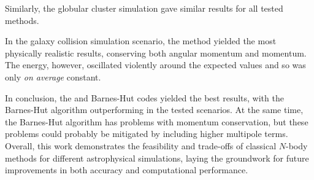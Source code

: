 Similarly, the globular cluster simulation gave similar results for all tested methods.

In the galaxy collision simulation scenario, the \PThreeM{} method yielded the most physically realistic results, conserving both angular momentum and momentum.
The energy, however, oscillated violently around the expected values and so was only \textit{on average} constant.

In conclusion, the \PThreeM{} and Barnes-Hut codes yielded the best results, with the Barnes-Hut algorithm outperforming \PThreeM{} in the tested scenarios.
At the same time, the Barnes-Hut algorithm has problems with momentum conservation, but these problems could probably be mitigated by including higher multipole terms.
Overall, this work demonstrates the feasibility and trade-offs of classical $N$-body methods for different astrophysical simulations, laying the groundwork for future improvements in both accuracy and computational performance.
